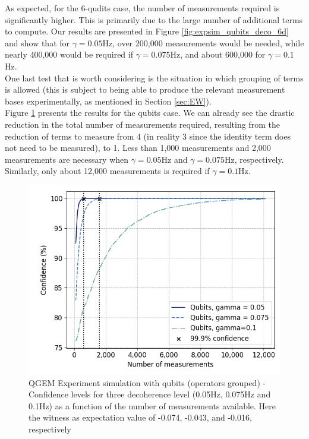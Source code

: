 \documentclass[%
 reprint,
 superscriptaddress,
 amsmath,
 amssymb,
 aps,
 longbibliography
]{revtex4-2}
\begin{document}
\indent As expected, for the 6-qudits case, the number of measurements required is significantly higher. This is primarily due to the large number of additional terms to compute. Our results are presented in Figure \ref{fig:expsim_qubits_deco_6d} and show that for $\gamma = 0.05$Hz, over 200,000 measurements would be needed, while nearly 400,000 would be required if $\gamma = 0.075$Hz, and about 600,000 for $\gamma = 0.1$Hz. \\
\indent One last test that is worth considering is the situation in which grouping of terms is allowed (this is subject to being able to produce the relevant measurement bases experimentally, as mentioned in Section \ref{sec:EW}). \\
\indent Figure \ref{fig:expsim_qubits_grouped} presents the results for the qubits case. We can already see the drastic reduction in the total number of measurements required, resulting from the reduction of terms to measure from 4 (in reality 3 since the identity term does not need to be measured), to 1. Less than 1,000 measurements and 2,000 measurements are necessary when $\gamma = 0.05$Hz and $\gamma = 0.075$Hz, respectively. Similarly, only about 12,000 measurements is required if $\gamma = 0.1$Hz.\\
	\begin{figure}
    		\includegraphics[width=1.\columnwidth]{EW_confidence_qubits_deco_grouped.png}\par\medskip
	    \caption{QGEM Experiment simulation with qubits (operators grouped) - Confidence levels for three decoherence level (0.05Hz, 0.075Hz and 0.1Hz) as a function of the number of measurements available. Here the witness as expectation value of -0.074, -0.043, and -0.016, respectively} \label{fig:expsim_qubits_grouped}
	\end{figure} 
\end{document}
